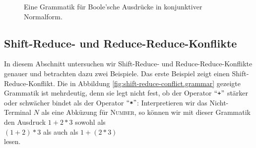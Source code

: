 \begin{figure}[htbp]
  \begin{center}    
  \end{center}
  \caption{Eine Grammatik f\"ur Boole'sche Ausdr\"ucke in konjunktiver Normalform.}
  \label{fig:BoolExpr.grammar}
\end{figure}


\subsection{Shift-Reduce- und Reduce-Reduce-Konflikte}
In diesem Abschnitt untersuchen wir Shift-Reduce- und Reduce-Reduce-Konflikte genauer und betrachten
dazu zwei Beispiele.  Das erste Beispiel zeigt einen Shift-Reduce-Konflikt.
Die in Abbildung \ref{fig:shift-reduce-conflict.grammar} gezeigte Grammatik ist mehrdeutig, denn sie
legt nicht fest, ob der Operator $\mbox{``\texttt{+}''}$ st\"arker oder schw\"acher bindet als der Operator
$\mbox{``\texttt{*}''}$:  Interpretieren wir das Nicht-Terminal $N$ als eine Abk\"uzung f\"ur \textsc{Number},
so k\"onnen wir mit dieser Grammatik den Ausdruck $1 + 2 * 3$ sowohl als
\\[0.2cm]
\hspace*{1.3cm}
$(1 + 2) * 3$ \quad als auch als \quad $1 + (2 *3)$ \quad 
\\
lesen.  

